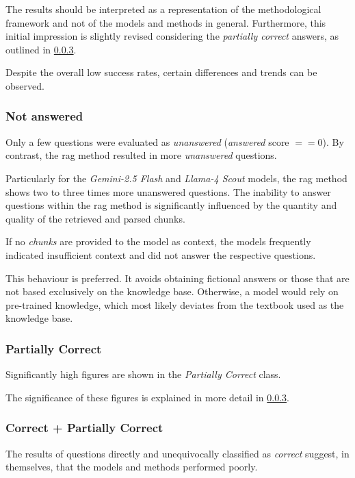 The results should be interpreted as a representation of the methodological framework and not of the models and methods in general.
Furthermore, this initial impression is slightly revised considering the \textit{partially correct} answers, as outlined in \cref{subsub:correct_partially_combined}.

Despite the overall low success rates, certain differences and trends can be observed.

\subsubsection{Not answered}

Only a few questions were evaluated as \textit{unanswered} (\textit{answered} score $== 0$).
By contrast, the \ac{rag} method resulted in more \textit{unanswered} questions.

Particularly for the \textit{Gemini-2.5 Flash} and \textit{Llama-4 Scout} models, the \ac{rag} method shows two to three times more unanswered questions.
The inability to answer questions within the \ac{rag} method is significantly influenced by the quantity and quality of the retrieved and parsed chunks.

If no \textit{chunks} are provided to the model as context, the models frequently indicated insufficient context and did not answer the respective questions.

This behaviour is preferred.
It avoids obtaining fictional answers or those that are not based exclusively on the knowledge base.
Otherwise, a model would rely on pre-trained knowledge, which most likely deviates from the textbook used as the knowledge base.
%
\subsubsection{Partially Correct}
Significantly high figures are shown in the \textit{Partially Correct} class.

The significance of these figures is explained in more detail in \cref{subsub:correct_partially_combined}.


\subsubsection{Correct + Partially Correct}\label{subsub:correct_partially_combined}

The results of questions directly and unequivocally classified as \textit{correct} suggest, in themselves, that the models and methods performed poorly.

